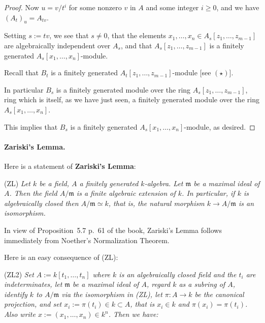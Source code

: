 \documentclass[12pt,letterpaper]{article}%
\newcommand{\mf}{\mathfrak}
\newcommand{\mmm}{\mf m}
\newcommand{\nn}{\noindent}
\begin{document}
\begin{proof}
Now $u=v/t^i$ for some nonzero $v$ in $A$ and some integer $i\ge0$, and we have $(A_t)_u=A_{tv}$. 

Setting $s:=tv$, we see that $s\ne0$, that the elements $x_1,\dots,x_n\in A_s[z_1,\dots,z_{m-1}]$ are algebraically independent over $A_s$, and that $A_s[z_1,\dots,z_{m-1}]$ is a finitely generated $A_s[x_1,\dots,x_n]$-module. 

Recall that $B_t$ is a finitely generated $A_t[z_1,\dots,z_{m-1}]$-module [see $(\star)$]. 

In particular $B_s$ is a finitely generated module over the ring $A_s[z_1,\dots,z_{m-1}]$, ring which is itself, as we have just seen, a finitely generated module over the ring $A_s[x_1,\dots,x_n]$. 

This implies that $B_s$ is a finitely generated $A_s[x_1,\dots,x_n]$-module, as desired.
\end{proof}%

\paragraph{Zariski's Lemma.}\label{ZL}%

Here is a statement of \textbf{Zariski's Lemma}:

\nn(ZL) \emph{Let $k$ be a field, $A$ a finitely generated $k$-algebra. Let $\mmm$ be a maximal ideal of $A$. Then the field $A/\mmm$ is a finite algebraic extension of $k$. In particular, if $k$ is algebraically closed then $A/\mmm\simeq k$, that is, the natural morphism $k\to A/\mmm$ is an isomorphism.}

In view of Proposition~5.7 p.~61 of the book, Zariski's Lemma follows immediately from Noether's Normalization Theorem. 

Here is an easy consequence of (ZL):

\nn(ZL2) \emph{Set $A:=k[t_1,\dots,t_n]$ where $k$ is an algebraically closed field and the $t_i$ are indeterminates, let $\mmm$ be a maximal ideal of $A$, regard $k$ as a subring of $A$, identify $k$ to $A/\mmm$ via the isomorphism in (ZL), let $\pi:A\to k$ be the canonical projection, and set $x_i:=\pi(t_i)\in k\subset A$, that is $x_i\in k$ and $\pi(x_i)=\pi(t_i)$. Also write $x:=(x_1,\dots,x_n)\in k^n$. Then we have:}
\end{document}
